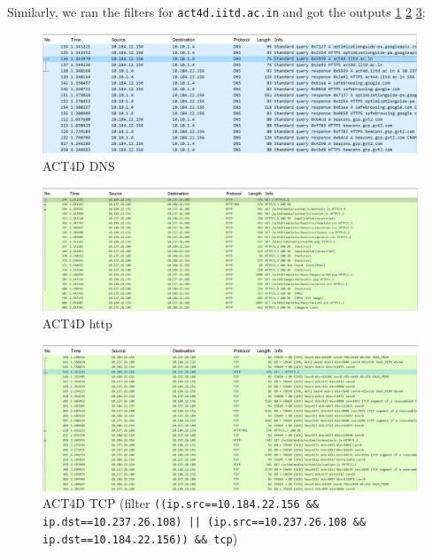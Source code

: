 \clearpage

Similarly, we ran the filters for {\tt act4d.iitd.ac.in} and got the outputs \cref{fig:ACT4DDNS} \cref{fig:ACT4DHTTP} \cref{fig:ACT4DTCP}:
\begin{figure}[!ht]
    \centering
    \includegraphics[scale=0.5]{images/act4d dns.png}
    \caption{ACT4D DNS}
    \label{fig:ACT4DDNS}
\end{figure}

\begin{figure}[!ht]
    \centering
    \includegraphics[scale=0.5]{images/act4d http.png}
    \caption{ACT4D http}
    \label{fig:ACT4DHTTP}
\end{figure}

\begin{figure}[!ht]
    \centering
    \includegraphics[scale=0.5]{images/act4d tcp.png}
    \caption{ACT4D TCP (filter {\tt ((ip.src==10.184.22.156 \&\& ip.dst==10.237.26.108) || 
    (ip.src==10.237.26.108 \&\& ip.dst==10.184.22.156)) \&\& tcp})}
    \label{fig:ACT4DTCP}
\end{figure}

